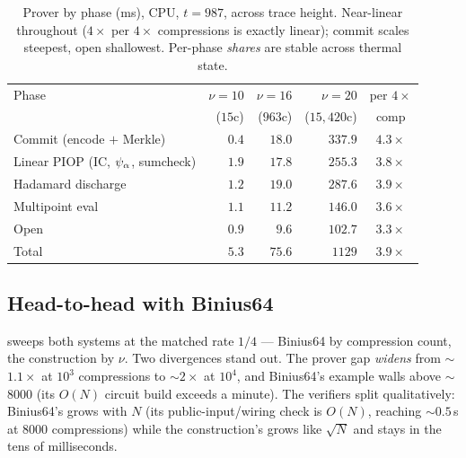 \begin{table}[h]
\centering
\renewcommand{\arraystretch}{1.2}
\begin{tabular}{l r r r c}
\toprule
Phase & $\nu{=}10$ & $\nu{=}16$ & $\nu{=}20$ & per $4\times$ \\
      & ($15$c) & ($963$c) & ($15{,}420$c) & comp \\
\midrule
Commit (encode $+$ Merkle)          & $0.4$ & $18.0$ & $337.9$ & $4.3\times$ \\
Linear PIOP (IC, $\psi_{\alpha}$, sumcheck) & $1.9$ & $17.8$ & $255.3$ & $3.8\times$ \\
Hadamard discharge                  & $1.2$ & $19.0$ & $287.6$ & $3.9\times$ \\
Multipoint eval                     & $1.1$ & $11.2$ & $146.0$ & $3.6\times$ \\
Open                                & $0.9$ & $9.6$  & $102.7$ & $3.3\times$ \\
\midrule
Total                               & $5.3$ & $75.6$ & $1129$  & $3.9\times$ \\
\bottomrule
\end{tabular}
\caption{Prover by phase (ms), CPU, $t = 987$, across trace height. Near-linear
throughout ($4\times$ per $4\times$ compressions is exactly linear); commit
scales steepest, open shallowest. Per-phase \emph{shares} are stable across
thermal state.}
\label{tab:perphase}
\end{table}

\subsection{Head-to-head with Binius64}
\label{sec:app-binius}

 sweeps both systems at the matched rate $1/4$ --- Binius64 by
compression count, the construction by $\nu$. Two divergences stand out. The
prover gap \emph{widens} from $\sim$$1.1\times$ at $10^3$ compressions to
$\sim$$2\times$ at $10^4$, and Binius64's example walls above $\sim$$8000$
(its $O(N)$ circuit build exceeds a minute). The verifiers split qualitatively:
Binius64's grows with $N$ (its public-input/wiring check is $O(N)$, reaching
$\sim$$0.5$\,s at $8000$ compressions) while the construction's grows like
$\sqrt N$ and stays in the tens of milliseconds.

